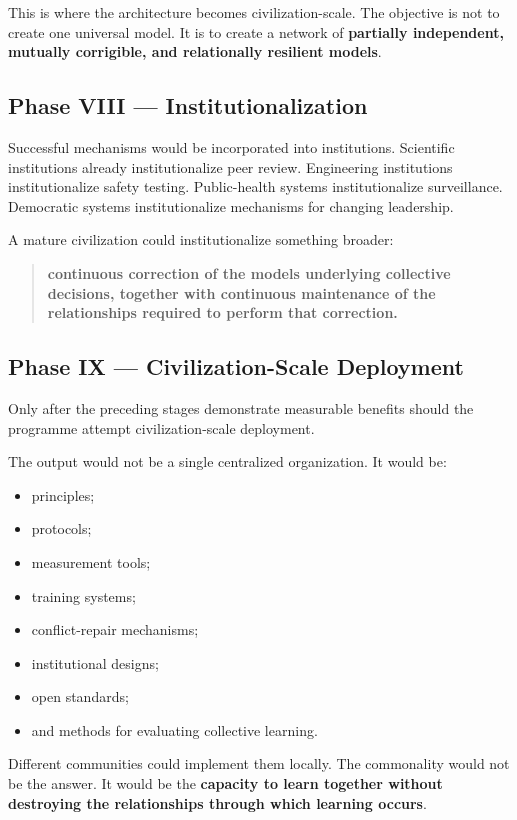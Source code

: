 \documentclass{article}
\begin{document}
This is where the architecture becomes civilization-scale. The objective is not to create one universal model. It is to create a network of \textbf{partially independent, mutually corrigible, and relationally resilient models}.

\subsection{Phase VIII — Institutionalization}
Successful mechanisms would be incorporated into institutions. Scientific institutions already institutionalize peer review. Engineering institutions institutionalize safety testing. Public-health systems institutionalize surveillance. Democratic systems institutionalize mechanisms for changing leadership.

A mature civilization could institutionalize something broader:
\begin{quote}
    \textbf{continuous correction of the models underlying collective decisions, together with continuous maintenance of the relationships required to perform that correction.}
\end{quote}

\subsection{Phase IX — Civilization-Scale Deployment}
Only after the preceding stages demonstrate measurable benefits should the programme attempt civilization-scale deployment.

The output would not be a single centralized organization. It would be:
\begin{itemize}
    \item principles;
    \item protocols;
    \item measurement tools;
    \item training systems;
    \item conflict-repair mechanisms;
    \item institutional designs;
    \item open standards;
    \item and methods for evaluating collective learning.
\end{itemize}

Different communities could implement them locally. The commonality would not be the answer. It would be the \textbf{capacity to learn together without destroying the relationships through which learning occurs}.
\end{document}
